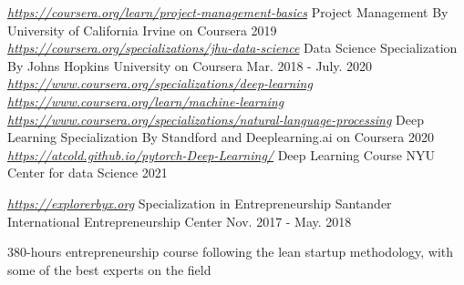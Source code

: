 \begin{cventries}
  
  \cvent
    {\href{https://coursera.org/learn/project-management-basics}{\textit{https://coursera.org/learn/project-management-basics}}} %
    {Project Management} %
    {By University of California Irvine on Coursera} %
    {2019} %
  \cvent
    {\href{https://coursera.org/specializations/jhu-data-science}{\textit{https://coursera.org/specializations/jhu-data-science}}} %
    {Data Science Specialization} %
    {By Johns Hopkins University on Coursera} %
    {Mar. 2018 - July. 2020} %
  \cvent
    {\href{https://www.coursera.org/specializations/deep-learning}{\textit{https://www.coursera.org/specializations/deep-learning}}
    \href{https://www.coursera.org/learn/machine-learning}{\textit{https://www.coursera.org/learn/machine-learning}}
    \href{https://www.coursera.org/specializations/natural-language-processing}{\textit{https://www.coursera.org/specializations/natural-language-processing}}} %
    {Deep Learning Specialization} %
    {By Standford and Deeplearning.ai on Coursera} %
    {2020} %
  \cventry
    {\href{https://atcold.github.io/pytorch-Deep-Learning/}{\textit{https://atcold.github.io/pytorch-Deep-Learning/}}} %
    {Deep Learning Course} %
    {NYU Center for data Science} %
    {2021} %
    {
    \begin{cvitems} %
    \end{cvitems}
    }
  \cventry
    {\href{https://explorerbyx.org}{\textit{https://explorerbyx.org}}} %
    {Specialization in Entrepreneurship} %
    {Santander International Entrepreneurship Center} %
    {Nov. 2017 - May. 2018} %
    {
    \begin{cvitems} %
        \item {380-hours entrepreneurship course following the lean startup  methodology, with some of the best experts on the field}
    \end{cvitems}
    }
\end{cventries}
